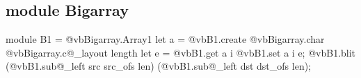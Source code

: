 \documentclass[10pt,landscape]{article}
\begin{document}
\begin{multicols}{3}
\subsection{module Bigarray}

\begin{Verbacorner}
module B1 = {@vb{}Bigarray.Array1}
let a = {@vb{}B1.create} {@vb{}Bigarray.char} {@vb{}Bigarray.c@_layout} length
let e = {@vb{}B1.get} a i
{@vb{}B1.set} a i e;
{@vb{}B1.blit}
  ({@vb{}B1.sub@_left} src src_ofs len)
  ({@vb{}B1.sub@_left} dst dst_ofs len);
\end{Verbacorner}

\end{multicols}
\end{document}
